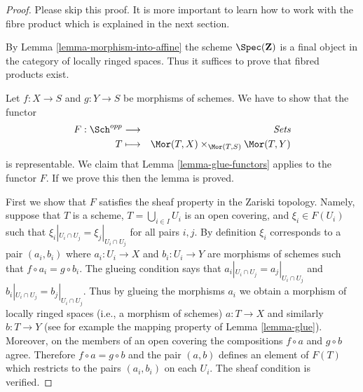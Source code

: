\begin{proof}
Please skip this proof. It is more important to learn
how to work with the fibre product which is explained in
the next section.

\medskip\noindent
By Lemma \ref{lemma-morphism-into-affine}
the scheme $\Spec(\mathbf{Z})$ is a final
object in the category of locally ringed spaces. Thus it
suffices to prove that fibred products exist.

\medskip\noindent
Let $f : X \to S$ and $g : Y \to S$ be morphisms of schemes. We have to show
that the functor
\begin{eqnarray*}
F : \Sch^{opp} & \longrightarrow & \textit{Sets} \\
T & \longmapsto &
\Mor(T, X) \times_{\Mor(T, S)} \Mor(T, Y)
\end{eqnarray*}
is representable. We claim that Lemma \ref{lemma-glue-functors}
applies to the functor $F$. If we prove this then the lemma is proved.

\medskip\noindent
First we show that $F$ satisfies the sheaf property in the
Zariski topology. Namely, suppose that $T$ is a scheme,
$T = \bigcup_{i \in I} U_i$ is an open covering, and
$\xi_i \in F(U_i)$ such that
$\xi_i|_{U_i \cap U_j} =  \xi_j|_{U_i \cap U_j}$ for
all pairs $i, j$. By definition $\xi_i$ corresponds to
a pair $(a_i, b_i)$ where $a_i : U_i \to X$ and $b_i : U_i \to Y$
are morphisms of schemes such that $f \circ a_i = g \circ b_i$.
The glueing condition says that
$a_i|_{U_i \cap U_j} =  a_j|_{U_i \cap U_j}$
and
$b_i|_{U_i \cap U_j} =  b_j|_{U_i \cap U_j}$.
Thus by glueing the morphisms $a_i$ we obtain a morphism
of locally ringed spaces (i.e., a morphism of schemes)
$a : T \to X$ and similarly $b : T \to Y$ (see for example
the mapping property of Lemma \ref{lemma-glue}). Moreover,
on the members of an open covering the compositions
$f \circ a$ and $g \circ b$ agree. Therefore
$f \circ a = g \circ b$ and the pair $(a, b)$ defines
an element of $F(T)$ which restricts to the pairs
$(a_i, b_i)$ on each $U_i$. The sheaf condition is verified.


\end{proof}
